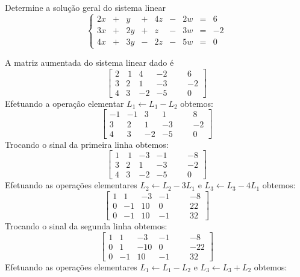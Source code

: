 \begin{problem}
Determine a solução geral do sistema linear
$$\left\{ \begin{array}{rrrrrrrrr}
 2x & + &  y & + & 4z & - & 2w & = &  6 \\
 3x & + & 2y & + &  z & - & 3w & = & -2 \\
 4x & + & 3y & - & 2z & - & 5w & = &  0 \end{array} \right.$$
\end{problem}
\begin{solution}
A matriz aumentada do sistema linear dado é 
$$ \left[\begin{array}{rrrrr|rr}
	2 & \ 1 &   4  &  -2   & & &    6      \\
	3 &   2 &   1  &  -3   & & &   -2      \\ 
	4 &   3 &  -2  &  -5   & & &    0      \end{array}\right] $$
Efetuando a operação elementar $L_1 \leftarrow L_1 - L_2$ obtemos:
$$ \left[\begin{array}{rrrrr|rr}
 -1 &  -1 &   3  &   1   & & &    8      \\
	3 &   2 &   1  &  -3   & & &   -2      \\ 
	4 &   3 &  -2  &  -5   & & &    0      \end{array}\right] $$
Trocando o sinal da primeira linha obtemos:
$$ \left[\begin{array}{rrrrr|rr}
	1 & \ 1 &  -3  &  -1   & & &   -8      \\
	3 &   2 &   1  &  -3   & & &   -2      \\ 
	4 &   3 &  -2  &  -5   & & &    0      \end{array}\right] $$
Efetuando as operações elementares $L_2 \leftarrow L_2 - 3L_1$ e $L_3 \leftarrow L_3 - 4L_1$ obtemos:
$$ \left[\begin{array}{rrrrr|rr}
	1 &   1 &  -3  &  -1   & & &   -8      \\
	0 &  -1 &  10  &   0   & & &   22      \\ 
	0 &  -1 &  10  &  -1   & & &   32      \end{array}\right] $$
Trocando o sinal da segunda linha obtemos:
$$ \left[\begin{array}{rrrrr|rr}
	1 &   1 &   -3  &  -1   & & &   -8      \\
	0 &   1 &  -10  &   0   & & &  -22      \\ 
	0 &  -1 &   10  &  -1   & & &   32      \end{array}\right] $$
Efetuando as operações elementares $L_1 \leftarrow L_1 - L_2$ e $L_3 \leftarrow L_3 + L_2$ obtemos:

\end{solution}
